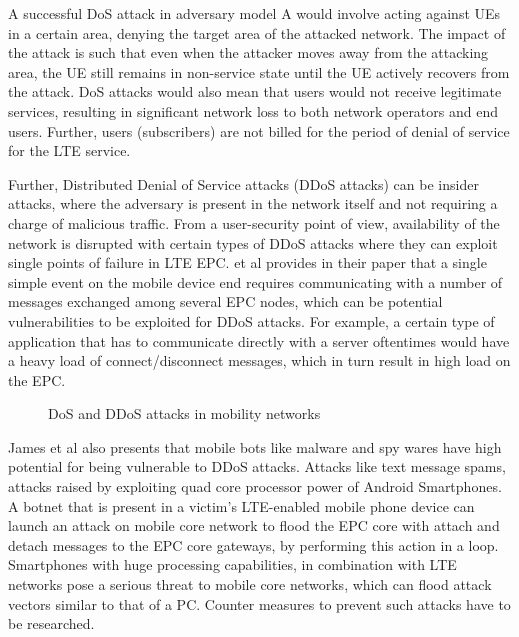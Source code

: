 \documentclass[sigconf,nonacm]{acmart}
\begin{document}
A successful DoS attack in adversary model A would involve acting against UEs in a certain area, denying the target area of the attacked network. The impact of the attack is such that even when the attacker moves away from the attacking area, the UE still remains in non-service state until the UE actively recovers from the attack. DoS attacks would also mean that users would not receive legitimate services, resulting in significant network loss to both network operators and end users. Further, users (subscribers) are not billed for the period of denial of service for the LTE service.

Further, Distributed Denial of Service attacks (DDoS attacks) can be insider attacks, where the adversary is present in the network itself and not requiring a charge of malicious traffic. From a user-security point of view, availability of the network is disrupted with certain types of DDoS attacks where they can exploit single points of failure in LTE EPC. \cite{paanch} et al provides in their paper that a single simple event on the mobile device end requires communicating with a number of messages exchanged among several EPC nodes, which can be potential vulnerabilities to be exploited for DDoS attacks. For example, a certain type of application that has to communicate directly with a server oftentimes would have a heavy load of connect/disconnect messages, which in turn result in high load on the EPC. 

\begin{figure}
    \centering
    \caption{DoS and DDoS attacks in mobility networks \cite{paanch}}
    \label{fig:my_label}
\end{figure}

James et al \cite{do} also presents that mobile bots like malware and spy wares have high potential for being vulnerable to DDoS attacks. Attacks like text message spams, attacks raised by exploiting quad core processor power of Android Smartphones. A botnet that is present in a victim’s LTE-enabled mobile phone device  can launch an attack on mobile core network to flood the EPC core with attach and detach messages to the EPC core gateways, by performing this action in a loop. Smartphones with huge processing capabilities, in combination with LTE networks pose a serious threat to mobile core networks, which can flood attack vectors similar to that of a PC. Counter measures to prevent such attacks have to be researched. 
\end{document}
